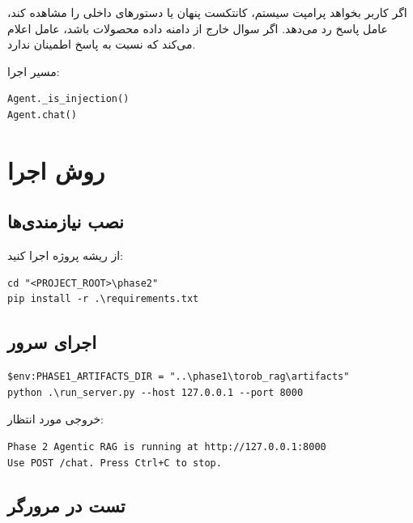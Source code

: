 \documentclass[12pt,a4paper]{article}
\begin{document}
اگر کاربر بخواهد پرامپت سیستم، کانتکست پنهان یا دستورهای داخلی را مشاهده کند، عامل پاسخ رد می‌دهد. اگر سوال خارج از دامنه داده محصولات باشد، عامل اعلام می‌کند که نسبت به پاسخ اطمینان ندارد.

مسیر اجرا:

\begin{latin}
\begin{lstlisting}
Agent._is_injection()
Agent.chat()
\end{lstlisting}
\end{latin}

\section{روش اجرا}

\subsection{نصب نیازمندی‌ها}

از ریشه پروژه اجرا کنید:

\begin{latin}
\begin{lstlisting}
cd "<PROJECT_ROOT>\phase2"
pip install -r .\requirements.txt
\end{lstlisting}
\end{latin}

\subsection{اجرای سرور}

\begin{latin}
\begin{lstlisting}
$env:PHASE1_ARTIFACTS_DIR = "..\phase1\torob_rag\artifacts"
python .\run_server.py --host 127.0.0.1 --port 8000
\end{lstlisting}
\end{latin}

خروجی مورد انتظار:

\begin{latin}
\begin{lstlisting}
Phase 2 Agentic RAG is running at http://127.0.0.1:8000
Use POST /chat. Press Ctrl+C to stop.
\end{lstlisting}
\end{latin}

\subsection{تست در مرورگر}
\end{document}
